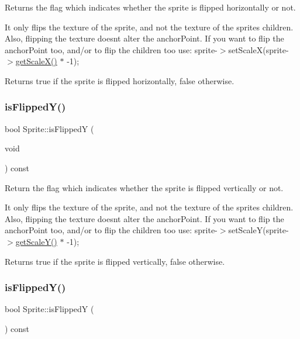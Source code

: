 Returns the flag which indicates whether the sprite is flipped horizontally or not.

It only flips the texture of the sprite, and not the texture of the sprite\textquotesingle{}s children. Also, flipping the texture doesn\textquotesingle{}t alter the anchor\+Point. If you want to flip the anchor\+Point too, and/or to flip the children too use\+: sprite-\/$>$set\+ScaleX(sprite-\/$>$\hyperlink{classNode_a27040ef8ab59ccf42b87d6ddc8d794e6}{get\+Scale\+X()} $\ast$ -\/1);

\begin{DoxyReturn}{Returns}
true if the sprite is flipped horizontally, false otherwise. 
\end{DoxyReturn}
\mbox{\label{classSprite_aed48b9f71be4e6c1d0bd2bbc8377ff17}} 
\subsubsection{\texorpdfstring{is\+Flipped\+Y()}{isFlippedY()}\hspace{0.1cm}{\footnotesize\ttfamily [1/2]}}
{\footnotesize\ttfamily bool Sprite\+::is\+FlippedY (\begin{DoxyParamCaption}\item[{void}]{ }\end{DoxyParamCaption}) const}

Return the flag which indicates whether the sprite is flipped vertically or not.

It only flips the texture of the sprite, and not the texture of the sprite\textquotesingle{}s children. Also, flipping the texture doesn\textquotesingle{}t alter the anchor\+Point. If you want to flip the anchor\+Point too, and/or to flip the children too use\+: sprite-\/$>$set\+ScaleY(sprite-\/$>$\hyperlink{classNode_ab87661ab8940512baf2e7639ea55ff87}{get\+Scale\+Y()} $\ast$ -\/1);

\begin{DoxyReturn}{Returns}
true if the sprite is flipped vertically, false otherwise. 
\end{DoxyReturn}
\mbox{\label{classSprite_aed48b9f71be4e6c1d0bd2bbc8377ff17}} 
\subsubsection{\texorpdfstring{is\+Flipped\+Y()}{isFlippedY()}\hspace{0.1cm}{\footnotesize\ttfamily [2/2]}}
{\footnotesize\ttfamily bool Sprite\+::is\+FlippedY (\begin{DoxyParamCaption}{ }\end{DoxyParamCaption}) const}

